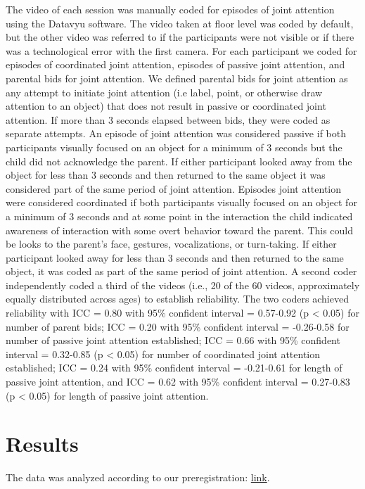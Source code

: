 \documentclass[10pt, letterpaper]{article}
\begin{document}
The video of each session was manually coded for episodes of joint
attention using the Datavyu software. The video taken at floor level was
coded by default, but the other video was referred to if the
participants were not visible or if there was a technological error with
the first camera. For each participant we coded for episodes of
coordinated joint attention, episodes of passive joint attention, and
parental bids for joint attention. We defined parental bids for joint
attention as any attempt to initiate joint attention (i.e label, point,
or otherwise draw attention to an object) that does not result in
passive or coordinated joint attention. If more than 3 seconds elapsed
between bids, they were coded as separate attempts. An episode of joint
attention was considered passive if both participants visually focused
on an object for a minimum of 3 seconds but the child did not
acknowledge the parent. If either participant looked away from the
object for less than 3 seconds and then returned to the same object it
was considered part of the same period of joint attention. Episodes
joint attention were considered coordinated if both participants
visually focused on an object for a minimum of 3 seconds and at some
point in the interaction the child indicated awareness of interaction
with some overt behavior toward the parent. This could be looks to the
parent's face, gestures, vocalizations, or turn-taking. If either
participant looked away for less than 3 seconds and then returned to the
same object, it was coded as part of the same period of joint attention.
A second coder independently coded a third of the videos (i.e., 20 of
the 60 videos, approximately equally distributed across ages) to
establish reliability. The two coders achieved reliability with ICC =
0.80 with 95\% confident interval = 0.57-0.92 (p \textless{} 0.05) for
number of parent bids; ICC = 0.20 with 95\% confident interval =
-0.26-0.58 for number of passive joint attention established; ICC = 0.66
with 95\% confident interval = 0.32-0.85 (p \textless{} 0.05) for number
of coordinated joint attention established; ICC = 0.24 with 95\%
confident interval = -0.21-0.61 for length of passive joint attention,
and ICC = 0.62 with 95\% confident interval = 0.27-0.83 (p \textless{}
0.05) for length of passive joint attention.

\section{Results}\label{results}

The data was analyzed according to our preregistration:
\href{https://osf.io/2bpdf/}{link}.
\end{document}
